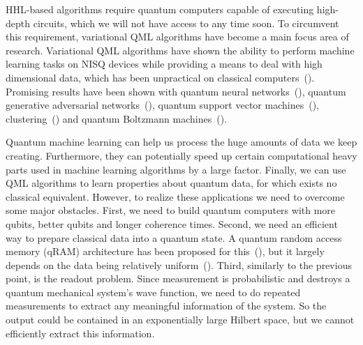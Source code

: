 \documentclass[a4paper,10pt]{article}
\begin{document}
HHL-based algorithms require quantum computers capable of executing high-depth circuits, which we will not have access to any time soon.
To circumvent this requirement, variational QML algorithms have become a main focus area of research.
Variational QML algorithms have shown the ability to perform machine learning tasks on NISQ devices while providing a means to deal with high dimensional data, which has been unpractical on classical computers~(\cite{mitarai2018quantum}).
Promising results have been shown with quantum neural networks~(\cite{qnn-near-term, schuld2018circuit, grant2018hierarchical}), quantum generative adversarial networks~(\cite{romero2019variational, benedetti2019adversarial}), quantum support vector machines~(\cite{havlivcek2019supervised, schuld2019quantum, ghobadi2019power}), clustering~(\cite{otterbach2017unsupervised}) and quantum Boltzmann machines~(\cite{verdon2017quantum, anschuetz2019realizing}).

Quantum machine learning can help us process the huge amounts of data we keep creating.
Furthermore, they can potentially speed up certain computational heavy parts used in machine learning algorithms by a large factor.
Finally, we can use QML algorithms to learn properties about quantum data, for which exists no classical equivalent.
However, to realize these applications we need to overcome some major obstacles.
First, we need to build quantum computers with more qubits, better qubits and longer coherence times.
Second, we need an efficient way to prepare classical data into a quantum state.
A quantum random access memory (qRAM) architecture has been proposed for this~(\cite{qram}), but it largely depends on the data being relatively uniform~(\cite{aaronson2015read}).
Third, similarly to the previous point, is the readout problem.
Since measurement is probabilistic and destroys a quantum mechanical system's wave function, we need to do repeated measurements to extract any meaningful information of the system.
So the output could be contained in an exponentially large Hilbert space, but we cannot efficiently extract this information.
\end{document}
